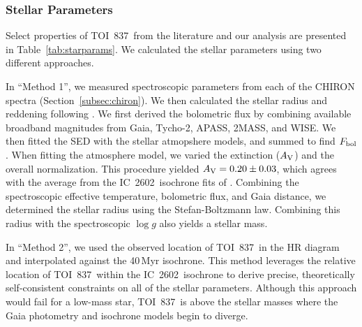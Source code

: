 \documentclass[12pt,twocolumn,tighten]{aastex63}
\newcommand{\tn}{TOI~837} %
\newcommand{\cn}{IC~2602} %
\begin{document}
\subsubsection{Stellar Parameters}
\label{subsec:starparams}

Select properties of \tn\ from the literature and our analysis are
presented in Table~\ref{tab:starparams}.  We calculated the stellar
parameters using two different approaches.


In ``Method 1'', we measured spectroscopic parameters from each of the
CHIRON spectra (Section~\ref{subsec:chiron}).  We then calculated the
stellar radius and reddening following \citet{stassun_accurate_2017}.
We first derived the bolometric flux by combining available broadband
magnitudes from Gaia, Tycho-2, APASS, 2MASS, and WISE.  We then fitted
the SED with the \citet{kurucz_atlas12_2013} stellar atmopshere
models, and summed to find $F_{\rm bol}$.  When fitting the atmosphere
model, we varied the extinction ($A_{\rm V}$) and the overall
normalization.  This procedure yielded $A_{\rm V} = 0.20\pm0.03$,
which agrees with the average from the \cn\ isochrone fits of
\citet{randich_gaiaeso_2018}.  Combining the spectroscopic effective
temperature, bolometric flux, and Gaia distance, we determined the
stellar radius using the Stefan-Boltzmann law.  Combining this radius
with the spectroscopic $\log g$ also yields a stellar mass.

In ``Method 2'', we  used the observed location of
\tn\ in the HR diagram and interpolated against the 40$\,$Myr
 isochrone.  This method leverages the relative location
of \tn\ within the  \cn\ isochrone to derive precise,
theoretically self-consistent constraints on all of the stellar
parameters.  Although this approach would fail for a low-mass star,
\tn\ is above the stellar masses where the Gaia photometry and
isochrone models begin to diverge. 
\end{document}
